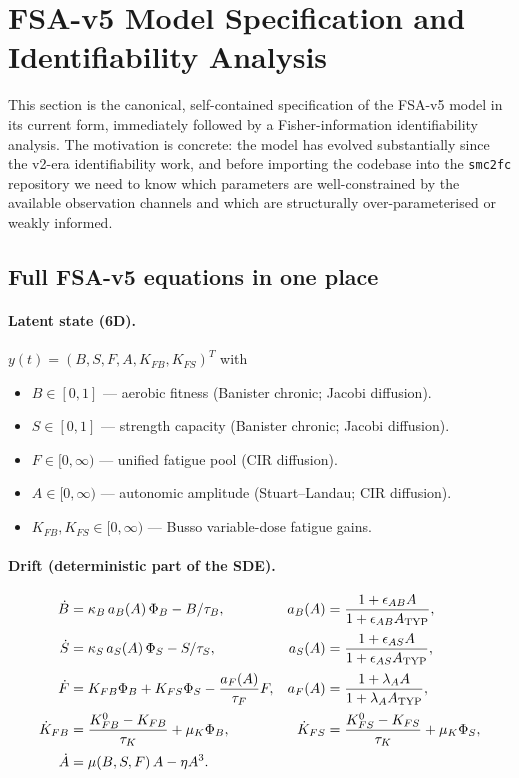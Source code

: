\section{FSA-v5 Model Specification and Identifiability Analysis} \label{sec:fsa-v5-fim}

This section is the canonical, self-contained specification of the FSA-v5 model in its current form, immediately followed by a Fisher-information identifiability analysis. The motivation is concrete: the model has evolved substantially since the v2-era identifiability work, and before importing the codebase into the \texttt{smc2fc} repository we need to know which parameters are well-constrained by the available observation channels and which are structurally over-parameterised or weakly informed.

\subsection{Full FSA-v5 equations in one place} \label{sec:v5-equations}

\paragraph{Latent state (6D).} $y(t) = (B, S, F, A, K_{FB}, K_{FS})^T$ with
\begin{itemize}
  \item $B \in [0,1]$ — aerobic fitness (Banister chronic; Jacobi diffusion).
  \item $S \in [0,1]$ — strength capacity (Banister chronic; Jacobi diffusion).
  \item $F \in [0, \infty)$ — unified fatigue pool (CIR diffusion).
  \item $A \in [0, \infty)$ — autonomic amplitude (Stuart--Landau; CIR diffusion).
  \item $K_{FB}, K_{FS} \in [0, \infty)$ — Busso variable-dose fatigue gains.
\end{itemize}

\paragraph{Drift (deterministic part of the SDE).}

\begin{align}
\dot B    &= \kappa_B \, a_B(A) \, \Phi_B - B / \tau_B,
  & a_B(A) &= \frac{1 + \epsilon_{AB} A}{1 + \epsilon_{AB} A_{\rm TYP}}, \\[2pt]
\dot S    &= \kappa_S \, a_S(A) \, \Phi_S - S / \tau_S,
  & a_S(A) &= \frac{1 + \epsilon_{AS} A}{1 + \epsilon_{AS} A_{\rm TYP}}, \\[2pt]
\dot F    &= K_{FB} \Phi_B + K_{FS} \Phi_S - \frac{a_F(A)}{\tau_F} F,
  & a_F(A) &= \frac{1 + \lambda_A A}{1 + \lambda_A A_{\rm TYP}}, \\[2pt]
\dot K_{FB} &= \frac{K_{FB}^0 - K_{FB}}{\tau_K} + \mu_K \Phi_B,
  & \dot K_{FS} &= \frac{K_{FS}^0 - K_{FS}}{\tau_K} + \mu_K \Phi_S, \\[2pt]
\dot A    &= \mu(B, S, F) \, A - \eta A^3.
\end{align}


